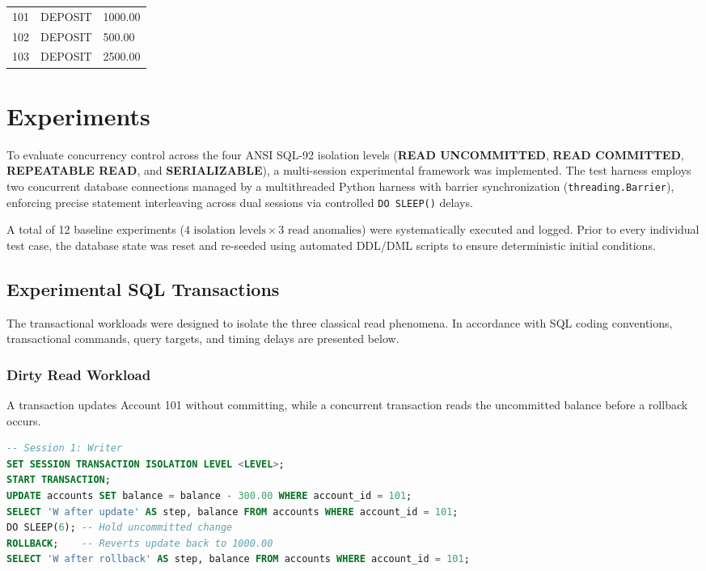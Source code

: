 \documentclass[sigconf, pbalance, nonacm]{acmart}
\begin{document}
\noindent
\begin{tabularx}{\columnwidth}{XXX}
101 & DEPOSIT & 1000.00 \\
102 & DEPOSIT & 500.00  \\
103 & DEPOSIT & 2500.00 \\
\end{tabularx}
\vspace{0.3cm}

\section{Experiments}

To evaluate concurrency control across the four ANSI SQL-92 isolation levels (\textbf{READ UNCOMMITTED}, \textbf{READ COMMITTED}, \textbf{REPEATABLE READ}, and \textbf{SERIALIZABLE}), a multi-session experimental framework was implemented. The test harness employs two concurrent database connections managed by a multithreaded Python harness with barrier synchronization (\texttt{threading.Barrier}), enforcing precise statement interleaving across dual sessions via controlled \texttt{DO SLEEP()} delays.

A total of 12 baseline experiments ($4\text{ isolation levels} \times 3\text{ read anomalies}$) were systematically executed and logged. Prior to every individual test case, the database state was reset and re-seeded using automated DDL/DML scripts to ensure deterministic initial conditions.

\subsection{Experimental SQL Transactions}
The transactional workloads were designed to isolate the three classical read phenomena. In accordance with SQL coding conventions, transactional commands, query targets, and timing delays are presented below.

\subsubsection{Dirty Read Workload}
A transaction updates Account 101 without committing, while a concurrent transaction reads the uncommitted balance before a rollback occurs.

\begin{lstlisting}[language=SQL, caption={Session 1 (Writer) Transaction for Dirty Read}]
-- Session 1: Writer
SET SESSION TRANSACTION ISOLATION LEVEL <LEVEL>;
START TRANSACTION;
UPDATE accounts SET balance = balance - 300.00 WHERE account_id = 101;
SELECT 'W after update' AS step, balance FROM accounts WHERE account_id = 101;
DO SLEEP(6); -- Hold uncommitted change
ROLLBACK;    -- Reverts update back to 1000.00
SELECT 'W after rollback' AS step, balance FROM accounts WHERE account_id = 101;
\end{lstlisting}
\end{document}
